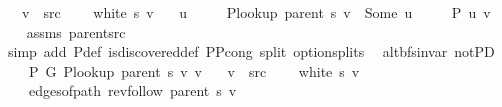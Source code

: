 \begin{isabellebody}
\ \ \ {\isachardoublequoteopen}v\ {\isasymnoteq}\ src{\isachardoublequoteclose}\isanewline
\ \ \ {\isachardoublequoteopen}{\isasymnot}\ white\ s\ v{\isachardoublequoteclose}\isanewline
\ \ \ u\ \isanewline
\ \ \ \ {\isachardoublequoteopen}P{\isacharunderscore}{\kern0pt}lookup\ {\isacharparenleft}{\kern0pt}parent\ s{\isacharparenright}{\kern0pt}\ v\ {\isacharequal}{\kern0pt}\ Some\ u{\isachardoublequoteclose}\isanewline
\ \ \ \ {\isachardoublequoteopen}{\isasymnot}\ P{\isacharprime}{\kern0pt}{\isacharprime}{\kern0pt}\ {\isacharbraceleft}{\kern0pt}u{\isacharcomma}{\kern0pt}\ v{\isacharbraceright}{\kern0pt}{\isachardoublequoteclose}%
\endisataginvisible
{\isafoldinvisible}%
%
\isadeliminvisible
\isanewline
%
\endisadeliminvisible
%
\isadelimproof
\ \ %
\endisadelimproof
%
\isatagproof
{}\isamarkupfalse%
\ assms\ parent{\isacharunderscore}{\kern0pt}src\isanewline
\ \ \isamarkupfalse%
\ {\isacharparenleft}{\kern0pt}simp\ add{\isacharcolon}{\kern0pt}\ P{\isacharprime}{\kern0pt}{\isacharunderscore}{\kern0pt}def\ is{\isacharunderscore}{\kern0pt}discovered{\isacharunderscore}{\kern0pt}def\ P{\isacharunderscore}{\kern0pt}P{\isacharprime}{\kern0pt}{\isacharprime}{\kern0pt}{\isacharunderscore}{\kern0pt}cong\ split{\isacharcolon}{\kern0pt}\ option{\isachardot}{\kern0pt}splits{\isacharparenleft}{\kern0pt}{}{\isacharparenright}{\kern0pt}{\isacharparenright}{\kern0pt}%
\endisatagproof
{\isafoldproof}%
%
\isadelimproof
\isanewline
%
\endisadelimproof
%
\isadeliminvisible
\isanewline
%
\endisadeliminvisible
%
\isataginvisible
{}\isamarkupfalse%
\ {\isacharparenleft}{\kern0pt}\ alt{\isacharunderscore}{\kern0pt}bfs{\isacharunderscore}{\kern0pt}invar{\isacharparenright}{\kern0pt}\ not{\isacharunderscore}{\kern0pt}P{\isacharprime}{\kern0pt}D{\isacharcolon}{\kern0pt}\isanewline
\ \ \ {\isachardoublequoteopen}{\isasymnot}\ P{\isacharprime}{\kern0pt}\ G{}\ {\isacharparenleft}{\kern0pt}P{\isacharunderscore}{\kern0pt}lookup\ {\isacharparenleft}{\kern0pt}parent\ s{\isacharparenright}{\kern0pt}\ v{\isacharparenright}{\kern0pt}\ v{\isachardoublequoteclose}\isanewline
\ \ \ {\isachardoublequoteopen}v\ {\isasymnoteq}\ src{\isachardoublequoteclose}\isanewline
\ \ \ {\isachardoublequoteopen}{\isasymnot}\ white\ s\ v{\isachardoublequoteclose}\isanewline
\ \ \isanewline
\ \ \ \ {\isachardoublequoteopen}edges{\isacharunderscore}{\kern0pt}of{\isacharunderscore}{\kern0pt}path\ {\isacharparenleft}{\kern0pt}rev{\isacharunderscore}{\kern0pt}follow\ {\isacharparenleft}{\kern0pt}parent\ s{\isacharparenright}{\kern0pt}\ v{\isacharparenright}{\kern0pt}\ {\isasymnoteq}\ {\isacharbrackleft}{\kern0pt}{\isacharbrackright}{\kern0pt}{\isachardoublequoteclose}\isanewline

\end{isabellebody}

